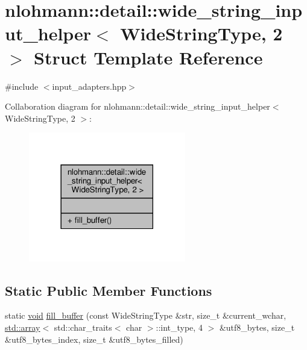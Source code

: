 \hypertarget{structnlohmann_1_1detail_1_1wide__string__input__helper_3_01_wide_string_type_00_012_01_4}{}\section{nlohmann\+:\+:detail\+:\+:wide\+\_\+string\+\_\+input\+\_\+helper$<$ Wide\+String\+Type, 2 $>$ Struct Template Reference}
\label{structnlohmann_1_1detail_1_1wide__string__input__helper_3_01_wide_string_type_00_012_01_4}


{\ttfamily \#include $<$input\+\_\+adapters.\+hpp$>$}



Collaboration diagram for nlohmann\+:\+:detail\+:\+:wide\+\_\+string\+\_\+input\+\_\+helper$<$ Wide\+String\+Type, 2 $>$\+:\nopagebreak
\begin{figure}[H]
\begin{center}
\leavevmode
\includegraphics[width=194pt]{structnlohmann_1_1detail_1_1wide__string__input__helper_3_01_wide_string_type_00_012_01_4__coll__graph}
\end{center}
\end{figure}
\subsection*{Static Public Member Functions}
\begin{DoxyCompactItemize}
\item 
static \hyperlink{namespacenlohmann_1_1detail_a59fca69799f6b9e366710cb9043aa77d}{void} \hyperlink{structnlohmann_1_1detail_1_1wide__string__input__helper_3_01_wide_string_type_00_012_01_4_a7ede7749f186f1a6a46c08abb607fd5c}{fill\+\_\+buffer} (const Wide\+String\+Type \&str, size\+\_\+t \&current\+\_\+wchar, \hyperlink{namespacenlohmann_1_1detail_a1ed8fc6239da25abcaf681d30ace4985af1f713c9e000f5d3f280adbd124df4f5}{std\+::array}$<$ std\+::char\+\_\+traits$<$ char $>$\+::int\+\_\+type, 4 $>$ \&utf8\+\_\+bytes, size\+\_\+t \&utf8\+\_\+bytes\+\_\+index, size\+\_\+t \&utf8\+\_\+bytes\+\_\+filled)
\end{DoxyCompactItemize}


